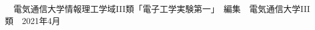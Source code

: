 \begin{thebibliography}{99}
　電気通信大学情報理工学域III類「電子工学実験第一」　編集　電気通信大学III類　2021年4月　
\end{thebibliography}

